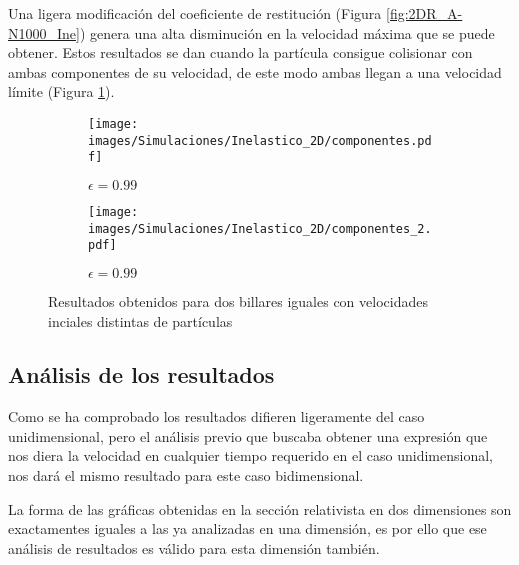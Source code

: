 Una ligera modificación del coeficiente de restitución (Figura \ref{fig:2DR_A-N1000_Ine}) genera una alta disminución en la velocidad máxima que se puede obtener. Estos resultados se dan cuando la partícula consigue colisionar con ambas componentes de su velocidad, de este modo ambas llegan a una velocidad límite (Figura \ref{fig:2DR_A-N1000_Ine_velocidades}).

\begin{figure}[H]
    \begin{subfigure}[b]{0.5\textwidth}
        \centering
        \texttt{[image: images/Simulaciones/Inelastico\_2D/componentes.pdf]}
        \caption{\( \epsilon = 0.99 \)}
    \end{subfigure}
    \hfill
    \begin{subfigure}[b]{0.5\textwidth}
        \centering
        \texttt{[image: images/Simulaciones/Inelastico\_2D/componentes\_2.pdf]}
        \caption{\( \epsilon = 0.99 \)}
    \end{subfigure}
    \caption{Resultados obtenidos para dos billares iguales con velocidades inciales distintas de partículas}
    \label{fig:2DR_A-N1000_Ine_velocidades}
\end{figure}

\subsection{Análisis de los resultados}

Como se ha comprobado los resultados difieren ligeramente del caso unidimensional, pero el análisis previo que buscaba obtener una expresión que nos diera la velocidad en cualquier tiempo requerido en el caso unidimensional, nos dará el mismo resultado para este caso bidimensional. 

\vspace{3mm}

La forma de las gráficas obtenidas en la sección relativista en dos dimensiones son exactamentes iguales a las ya analizadas en una dimensión, es por ello que ese análisis de resultados es válido para esta dimensión también. 

%